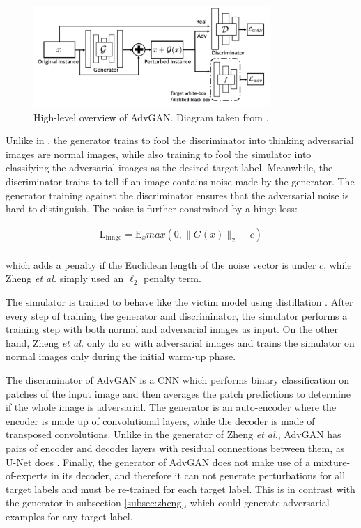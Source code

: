 \begin{figure}[ht]
    \centering
    \includegraphics[width=0.8\textwidth]{graphics/advgan.PNG}
    \caption{High-level overview of AdvGAN. Diagram taken from \cite{advGAN}.}
    \label{fig:advgan}
\end{figure}

Unlike in \cite{zheng_black_box_GAN}, the generator trains to fool the discriminator into thinking adversarial images are normal images, while also training to fool the simulator into classifying the adversarial images as the desired target label. Meanwhile, the discriminator trains to tell if an image contains noise made by the generator. The generator training against the discriminator ensures that the adversarial noise is hard to distinguish. The noise is further constrained by a hinge loss:

\begin{equation}
\begin{aligned}
\mathrm{L}_\textrm{hinge} = \mathrm{E}_x max(0, \|G(x)\|_2 - c)\\
\label{eq:advgan_hing_loss}
\end{aligned}
\end{equation}

which adds a penalty if the Euclidean length of the noise vector is under $c$, while Zheng \textit{et al.} simply used an $\ell_2$ penalty term.

The simulator is trained to behave like the victim model using distillation \cite{distillation}. After every step of training the generator and discriminator, the simulator performs a training step with both normal and adversarial images as input. On the other hand, Zheng \textit{et al.} \cite{zheng_black_box_GAN} only do so with adversarial images and trains the simulator on normal images only during the initial warm-up phase.

The discriminator of AdvGAN is a CNN which performs binary classification on patches of the input image and then averages the patch predictions to determine if the whole image is adversarial. The generator is an auto-encoder where the encoder is made up of convolutional layers, while the decoder is made of transposed convolutions. Unlike in the generator of Zheng \textit{et al.}, AdvGAN has pairs of encoder and decoder layers with residual connections between them, as U-Net does \cite{unet}. Finally, the generator of AdvGAN does not make use of a mixture-of-experts in its decoder, and therefore it can not generate perturbations for all target labels and must be re-trained for each target label. This is in contrast with the generator in subsection \ref{subsec:zheng}, which could generate adversarial examples for any target label.

